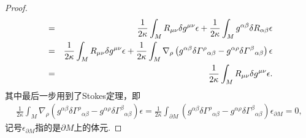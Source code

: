 \begin{proof}
\begin{eqnarray}
                &=&\frac{1}{2\kappa}\int_M{R}_{\mu\nu}\delta g^{\mu\nu}\epsilon+\frac{1}{2\kappa}\int_M g^{\alpha\beta}\delta {R}_{\alpha\beta}\epsilon\notag\\
                &=&\frac{1}{2\kappa}\int_M{R}_{\mu\nu}\delta g^{\mu\nu}\epsilon+\frac{1}{2\kappa}\int_M\nabla_\rho\left(g^{\alpha\beta}\delta{\varGamma^\rho}_{\alpha\beta}-g^{\alpha\rho}\delta{\varGamma^\beta}_{\alpha\beta}\right)\epsilon\notag\\
                &=&\frac{1}{2\kappa}\int_M{R}_{\mu\nu}\delta g^{\mu\nu}\epsilon.
            \end{eqnarray}
            其中最后一步用到了Stokes定理，即
            \begin{eqnarray*}
                \frac{1}{2\kappa}\int_M\nabla_\rho\left(g^{\alpha\beta}\delta{\varGamma^\rho}_{\alpha\beta}-g^{\alpha\rho}\delta{\varGamma^\beta}_{\alpha\beta}\right)\epsilon=\frac{1}{2\kappa}\int_{\partial M}\left(g^{\alpha\beta}\delta{\varGamma^\rho}_{\alpha\beta}-g^{\alpha\rho}\delta{\varGamma^\beta}_{\alpha\beta}\right)\epsilon_{\partial M}=0,
            \end{eqnarray*}
            记号$\epsilon_{\partial M}$指的是$\partial M$上的体元.
            

\end{proof}
